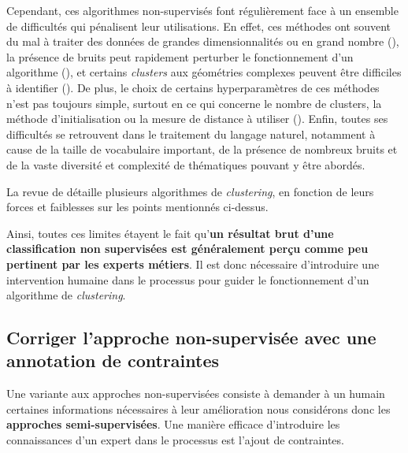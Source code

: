		Cependant, ces algorithmes non-supervisés font régulièrement face à un ensemble de difficultés qui pénalisent leur utilisations.
		En effet, ces méthodes ont souvent du mal à traiter des données de grandes dimensionnalités ou en grand nombre (\cite{steinbach-etal:2004:challenges-clustering-high}), la présence de bruits peut rapidement perturber le fonctionnement d'un algorithme (\cite{yang-wang:2004:competitive-algorithms-clustering}), et certains \textit{clusters} aux géométries complexes peuvent être difficiles à identifier (\cite{kriegel-etal:2011:density-based-clustering}).
		De plus, le choix de certains hyperparamètres de ces méthodes n'est pas toujours simple, surtout en ce qui concerne le nombre de clusters, la méthode d'initialisation ou la mesure de distance à utiliser (\cite{agarwal-etal:2011:issues-challenges-tools}).
		Enfin, toutes ses difficultés se retrouvent dans le traitement du langage naturel, notamment à cause de la taille de vocabulaire important, de la présence de nombreux bruits et de la vaste diversité et complexité de thématiques pouvant y être abordés.
		\begin{leftBarInformation}
			La revue de \cite{xu-tian:2015:comprehensive-survey-clustering} détaille plusieurs algorithmes de \textit{clustering}, en fonction de leurs forces et faiblesses sur les points mentionnés ci-dessus.
		\end{leftBarInformation}
		
		Ainsi, toutes ces limites étayent le fait qu'\textbf{un résultat brut d'une classification non supervisées est généralement perçu comme peu pertinent par les experts métiers}.
		Il est donc nécessaire d'introduire une intervention humaine dans le processus pour guider le fonctionnement d'un algorithme de \textit{clustering}.
		
	
	\subsection{Corriger l'approche non-supervisée avec une annotation de contraintes}
	\label{section:3.1.2-INTUITIONS-ORIGINES-SEMI-SUPERVISEES}
	
		Une variante aux approches non-supervisées consiste à demander à un humain certaines informations nécessaires à leur amélioration nous considérons donc les \textbf{approches semi-supervisées}.
		Une manière efficace d'introduire les connaissances d'un expert dans le processus est l'ajout de contraintes.
		
